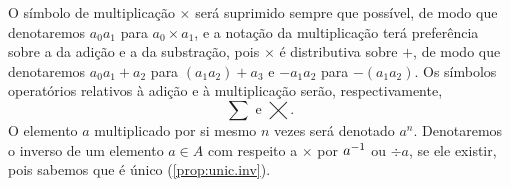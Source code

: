 \begin{notation}
O símbolo de multiplicação $\times$ será suprimido sempre que possível, de modo que denotaremos $a_0a_1$ para $a_0 \times a_1$, e a notação da multiplicação terá preferência sobre a da adição e a da substração, pois $\times$ é distributiva sobre $+$, de modo que denotaremos $a_0a_1 + a_2$ para $(a_1a_2) + a_3$ e $-a_1a_2$ para $-(a_1a_2)$. Os símbolos operatórios relativos à adição e à multiplicação serão, respectivamente,
	\begin{equation*}
	\sum \text{\ \ e\ \ } \bigtimes.
	\end{equation*}
O elemento $a$ multiplicado por si mesmo $n$ vezes será denotado $a^n$. Denotaremos o inverso de um elemento $a \in A$ com respeito a $\times$ por $a^{-1}$ ou $\div a$, se ele existir, pois sabemos que é único (\ref{prop:unic.inv}).
\end{notation}


